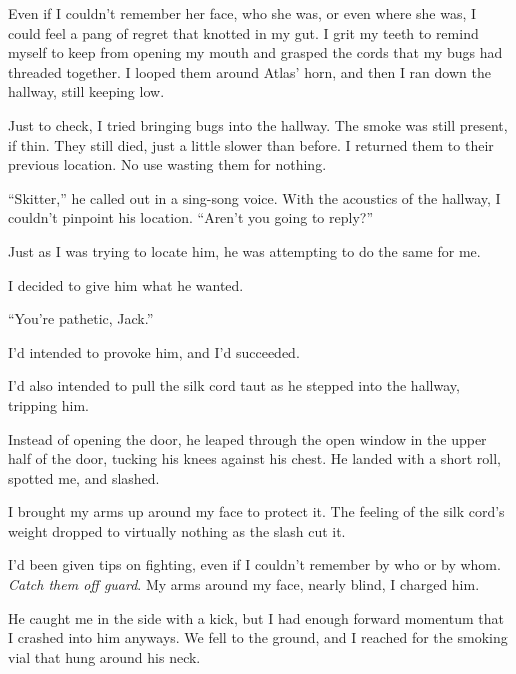 Even if I couldn't remember her face, who she was, or even where she was, I could feel a pang of regret that knotted in my gut.  I grit my teeth to remind myself to keep from opening my mouth and grasped the cords that my bugs had threaded together.  I looped them around Atlas' horn, and then I ran down the hallway, still keeping low.



Just to check, I tried bringing bugs into the hallway.  The smoke was still present, if thin.  They still died, just a little slower than before.  I returned them to their previous location.  No use wasting them for nothing.



``Skitter,'' he called out in a sing-song voice.  With the acoustics of the hallway, I couldn't pinpoint his location.  ``Aren't you going to reply?''



Just as I was trying to locate him, he was attempting to do the same for me.



I decided to give him what he wanted.



``You're pathetic, Jack.''



I'd intended to provoke him, and I'd succeeded.



I'd also intended to pull the silk cord taut as he stepped into the hallway, tripping him.



Instead of opening the door, he leaped through the open window in the upper half of the door, tucking his knees against his chest.  He landed with a short roll, spotted me, and slashed.



I brought my arms up around my face to protect it.  The feeling of the silk cord's weight dropped to virtually nothing as the slash cut it.



I'd been given tips on fighting, even if I couldn't remember by who or by whom.  \emph{Catch them off guard}.  My arms around my face, nearly blind, I charged him.



He caught me in the side with a kick, but I had enough forward momentum that I crashed into him anyways.  We fell to the ground, and I reached for the smoking vial that hung around his neck.




